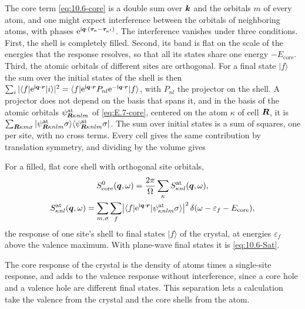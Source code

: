The core term \cref{eq:10.6-core} is a double sum over $\bm{k}$ and the orbitals $m$ of every atom, and one might expect interference between the orbitals of neighboring atoms, with phases $\mathrm{e}^{\mathrm{i}\bm{q}\cdot(\bm{\tau}_\kappa - \bm{\tau}_{\kappa'})}$. The interference vanishes under three conditions. First, the shell is completely filled. Second, its band is flat on the scale of the energies that the response resolves, so that all its states share one energy $-E_{\mathrm{core}}$. Third, the atomic orbitals of different sites are orthogonal. For a final state $|f\rangle$ the sum over the initial states of the shell is then $\sum_i|\langle f|\mathrm{e}^{\mathrm{i}\bm{q}\cdot\bm{r}}|i\rangle|^2 = \langle f|\mathrm{e}^{\mathrm{i}\bm{q}\cdot\bm{r}}P_{nl}\mathrm{e}^{-\mathrm{i}\bm{q}\cdot\bm{r}}|f\rangle$, with $P_{nl}$ the projector on the shell. A projector does not depend on the basis that spans it, and in the basis of the atomic orbitals $\psi^{\mathrm{at}}_{\bm{R}\kappa nlm}$ of \cref{eq:E.7-core}, centered on the atom $\kappa$ of cell $\bm{R}$, it is $\sum_{\bm{R}\kappa m\sigma}|\psi^{\mathrm{at}}_{\bm{R}\kappa nlm}\sigma\rangle\langle\psi^{\mathrm{at}}_{\bm{R}\kappa nlm}\sigma|$. The sum over initial states is a sum of squares, one per site, with no cross terms. Every cell gives the same contribution by translation symmetry, and dividing by the volume gives
\begin{keyresult}
For a filled, flat core shell with orthogonal site orbitals,
\begin{equation}
  \begin{gathered}
  S^0_{\mathrm{core}}(\bm{q},\omega) = \frac{2\pi}{\Omega}\sum_\kappa S^{\mathrm{at}}_{\kappa nl}(\bm{q},\omega), \\
  S^{\mathrm{at}}_{\kappa nl}(\bm{q},\omega) = \sum_{m,\sigma}\sum_f\bigl|\langle f|\mathrm{e}^{\mathrm{i}\bm{q}\cdot\bm{r}}|\psi^{\mathrm{at}}_{\kappa nlm}\sigma\rangle\bigr|^2\,\delta(\omega - \varepsilon_f - E_{\mathrm{core}}) ,
  \end{gathered}
  \label{eq:10.6-proj}
\end{equation}
the response of one site's shell to final states $|f\rangle$ of the crystal, at energies $\varepsilon_f$ above the valence maximum. With plane-wave final states it is \cref{eq:10.6-Sat}.
\end{keyresult}
\noindent The core response of the crystal is the density of atoms times a single-site response, and adds to the valence response without interference, since a core hole and a valence hole are different final states. This separation lets a calculation take the valence from the crystal and the core shells from the atom.

